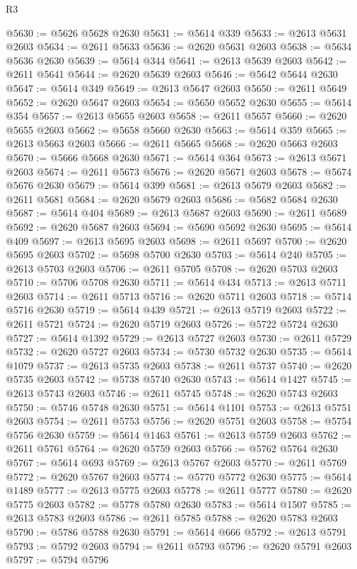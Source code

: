 \begin{lexlean}{R3}
\begin{coremodule}
@5630 := @5626 @5628 @2630
@5631 := @5614 @339
@5633 := @2613 @5631 @2603
@5634 := @2611 @5633
@5636 := @2620 @5631 @2603
@5638 := @5634 @5636 @2630
@5639 := @5614 @344
@5641 := @2613 @5639 @2603
@5642 := @2611 @5641
@5644 := @2620 @5639 @2603
@5646 := @5642 @5644 @2630
@5647 := @5614 @349
@5649 := @2613 @5647 @2603
@5650 := @2611 @5649
@5652 := @2620 @5647 @2603
@5654 := @5650 @5652 @2630
@5655 := @5614 @354
@5657 := @2613 @5655 @2603
@5658 := @2611 @5657
@5660 := @2620 @5655 @2603
@5662 := @5658 @5660 @2630
@5663 := @5614 @359
@5665 := @2613 @5663 @2603
@5666 := @2611 @5665
@5668 := @2620 @5663 @2603
@5670 := @5666 @5668 @2630
@5671 := @5614 @364
@5673 := @2613 @5671 @2603
@5674 := @2611 @5673
@5676 := @2620 @5671 @2603
@5678 := @5674 @5676 @2630
@5679 := @5614 @399
@5681 := @2613 @5679 @2603
@5682 := @2611 @5681
@5684 := @2620 @5679 @2603
@5686 := @5682 @5684 @2630
@5687 := @5614 @404
@5689 := @2613 @5687 @2603
@5690 := @2611 @5689
@5692 := @2620 @5687 @2603
@5694 := @5690 @5692 @2630
@5695 := @5614 @409
@5697 := @2613 @5695 @2603
@5698 := @2611 @5697
@5700 := @2620 @5695 @2603
@5702 := @5698 @5700 @2630
@5703 := @5614 @240
@5705 := @2613 @5703 @2603
@5706 := @2611 @5705
@5708 := @2620 @5703 @2603
@5710 := @5706 @5708 @2630
@5711 := @5614 @434
@5713 := @2613 @5711 @2603
@5714 := @2611 @5713
@5716 := @2620 @5711 @2603
@5718 := @5714 @5716 @2630
@5719 := @5614 @439
@5721 := @2613 @5719 @2603
@5722 := @2611 @5721
@5724 := @2620 @5719 @2603
@5726 := @5722 @5724 @2630
@5727 := @5614 @1392
@5729 := @2613 @5727 @2603
@5730 := @2611 @5729
@5732 := @2620 @5727 @2603
@5734 := @5730 @5732 @2630
@5735 := @5614 @1079
@5737 := @2613 @5735 @2603
@5738 := @2611 @5737
@5740 := @2620 @5735 @2603
@5742 := @5738 @5740 @2630
@5743 := @5614 @1427
@5745 := @2613 @5743 @2603
@5746 := @2611 @5745
@5748 := @2620 @5743 @2603
@5750 := @5746 @5748 @2630
@5751 := @5614 @1101
@5753 := @2613 @5751 @2603
@5754 := @2611 @5753
@5756 := @2620 @5751 @2603
@5758 := @5754 @5756 @2630
@5759 := @5614 @1463
@5761 := @2613 @5759 @2603
@5762 := @2611 @5761
@5764 := @2620 @5759 @2603
@5766 := @5762 @5764 @2630
@5767 := @5614 @693
@5769 := @2613 @5767 @2603
@5770 := @2611 @5769
@5772 := @2620 @5767 @2603
@5774 := @5770 @5772 @2630
@5775 := @5614 @1489
@5777 := @2613 @5775 @2603
@5778 := @2611 @5777
@5780 := @2620 @5775 @2603
@5782 := @5778 @5780 @2630
@5783 := @5614 @1507
@5785 := @2613 @5783 @2603
@5786 := @2611 @5785
@5788 := @2620 @5783 @2603
@5790 := @5786 @5788 @2630
@5791 := @5614 @666
@5792 := @2613 @5791
@5793 := @5792 @2603
@5794 := @2611 @5793
@5796 := @2620 @5791 @2603
@5797 := @5794 @5796

\end{coremodule}
\end{lexlean}
